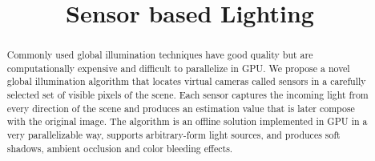 \documentclass[10pt, conference]{IEEEtran}
\begin{document}
%
\title{Sensor based Lighting}

\newif\iffinal
\finaltrue
\newcommand{\jemsid}{99999}


\iffinal
  \author{%
  
  }
\else
  \author{Sibgrapi paper ID: \jemsid \\ }
\fi







\maketitle


\begin{abstract}
Commonly used global illumination techniques have good quality but are computationally expensive and difficult to parallelize in GPU.
We propose a novel global illumination algorithm that locates virtual cameras called sensors in a carefully selected set of visible pixels of the scene. 
Each sensor captures the incoming light from every direction of the scene and produces an estimation value that is later compose with the original image. 
The algorithm is an offline solution implemented in GPU in a very parallelizable way, supports arbitrary-form light sources, and produces soft shadows, ambient occlusion and color bleeding effects.


%
\end{abstract}
\end{document}
